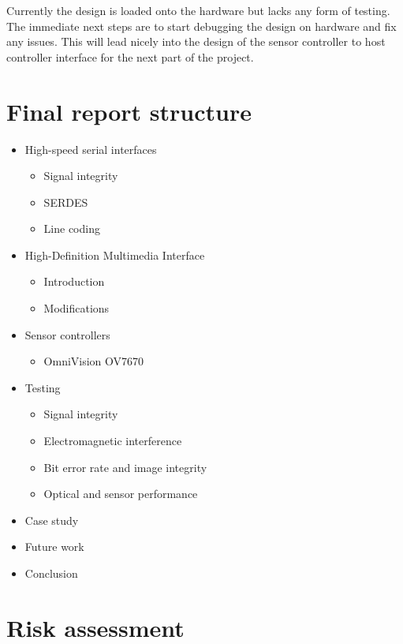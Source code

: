 \documentclass[a4paper]{report}
\begin{document}
Currently the design is loaded onto the hardware but lacks any form of testing. The immediate next steps are to start debugging the design on hardware and fix any issues. This will lead nicely into the design of the sensor controller to host controller interface for the next part of the project.

\chapter{Final report structure}

\begin{itemize}
  \item High-speed serial interfaces
  \begin{itemize}
    \item Signal integrity
    \item SERDES
    \item Line coding
  \end{itemize}
  \item High-Definition Multimedia Interface
  \begin{itemize}
  \item Introduction
    \item Modifications
  \end{itemize}
  \item Sensor controllers
  \begin{itemize}
  \item OmniVision OV7670
  \end{itemize}
  \item Testing
  \begin{itemize}
  \item Signal integrity
    \item Electromagnetic interference
    \item Bit error rate and image integrity
    \item Optical and sensor performance
  \end{itemize}
  \item Case study
  \item Future work
  \item Conclusion
\end{itemize}

\chapter{Risk assessment}
\end{document}
